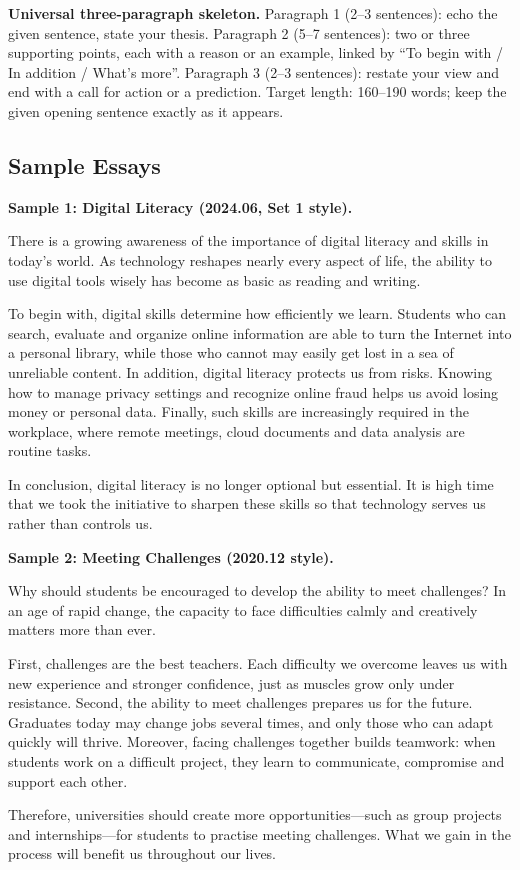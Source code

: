 \noindent\textbf{Universal three-paragraph skeleton.}\quad
Paragraph 1 (2--3 sentences): echo the given sentence, state your thesis.
Paragraph 2 (5--7 sentences): two or three supporting points, each with a reason or an example, linked by ``To begin with / In addition / What's more''.
Paragraph 3 (2--3 sentences): restate your view and end with a call for action or a prediction.
Target length: 160--190 words; keep the given opening sentence exactly as it appears.
\par

\subsection{Sample Essays}

\noindent\textbf{Sample 1: Digital Literacy (2024.06, Set 1 style).}
\par\medskip
\noindent There is a growing awareness of the importance of digital literacy and skills in today's world. As technology reshapes nearly every aspect of life, the ability to use digital tools wisely has become as basic as reading and writing.
\par\smallskip
\noindent To begin with, digital skills determine how efficiently we learn. Students who can search, evaluate and organize online information are able to turn the Internet into a personal library, while those who cannot may easily get lost in a sea of unreliable content. In addition, digital literacy protects us from risks. Knowing how to manage privacy settings and recognize online fraud helps us avoid losing money or personal data. Finally, such skills are increasingly required in the workplace, where remote meetings, cloud documents and data analysis are routine tasks.
\par\smallskip
\noindent In conclusion, digital literacy is no longer optional but essential. It is high time that we took the initiative to sharpen these skills so that technology serves us rather than controls us.
\par\medskip

\noindent\textbf{Sample 2: Meeting Challenges (2020.12 style).}
\par\medskip
\noindent Why should students be encouraged to develop the ability to meet challenges? In an age of rapid change, the capacity to face difficulties calmly and creatively matters more than ever.
\par\smallskip
\noindent First, challenges are the best teachers. Each difficulty we overcome leaves us with new experience and stronger confidence, just as muscles grow only under resistance. Second, the ability to meet challenges prepares us for the future. Graduates today may change jobs several times, and only those who can adapt quickly will thrive. Moreover, facing challenges together builds teamwork: when students work on a difficult project, they learn to communicate, compromise and support each other.
\par\smallskip
\noindent Therefore, universities should create more opportunities---such as group projects and internships---for students to practise meeting challenges. What we gain in the process will benefit us throughout our lives.
\par\medskip

